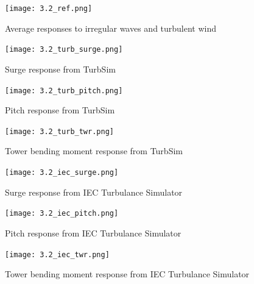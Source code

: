 \documentclass[a4paper, 11pt]{article}
\begin{document}
\begin{figure}[H]
    \centering
    \texttt{[image: 3.2\_ref.png]}
    \caption{\small Average responses to irregular waves and turbulent wind \cite{Robertson2014}}
    \label{fig:3.2_ref}
\end{figure}

\begin{figure}[H]
    \begin{minipage}{0.48\textwidth}
        \centering
        \texttt{[image: 3.2\_turb\_surge.png]}
        \caption{\small Surge response from TurbSim}
        \label{fig:3.2_turb_surge}
    \end{minipage}
    \hfill
    \begin{minipage}{0.5\textwidth}
        \centering
        \texttt{[image: 3.2\_turb\_pitch.png]}
        \caption{\small Pitch response from TurbSim}
        \label{fig:3.2_turb_pitch}
    \end{minipage}
\end{figure}

\begin{figure}[H]
    \begin{minipage}{0.48\textwidth}
        \centering
        \texttt{[image: 3.2\_turb\_twr.png]}
        \caption{\small Tower bending moment response from TurbSim}
        \label{fig:3.2_turb_twr}
    \end{minipage}
    \hfill
    \begin{minipage}{0.5\textwidth}
        \centering
        \texttt{[image: 3.2\_iec\_surge.png]}
        \caption{\small Surge response from IEC Turbulance Simulator}
        \label{fig:3.2_iec_surge}
    \end{minipage}
\end{figure}

\begin{figure}[H]
    \begin{minipage}{0.48\textwidth}
        \centering
        \texttt{[image: 3.2\_iec\_pitch.png]}
        \caption{\small Pitch response from IEC Turbulance Simulator}
        \label{fig:3.2_iec_pitch}
    \end{minipage}
    \hfill
    \begin{minipage}{0.5\textwidth}
        \centering
        \texttt{[image: 3.2\_iec\_twr.png]}
        \caption{\small Tower bending moment response from IEC Turbulance Simulator}
        \label{fig:3.2_iec_twr}
    \end{minipage}
\end{figure}
\end{document}
